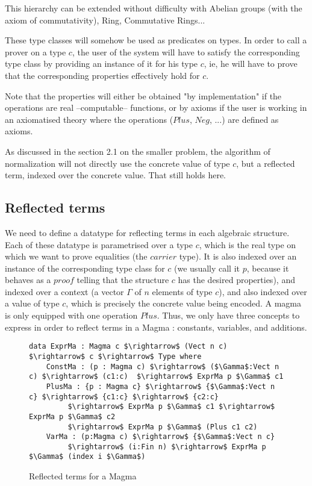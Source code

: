 This hierarchy can be extended without difficulty with Abelian groups (with the axiom of commutativity), Ring, Commutative Rings...

These type classes will somehow be used as predicates on types. In order to call a prover on a type $c$, the user of the system will have to satisfy the corresponding type class by providing an instance of it for his type $c$, ie, he will have to prove that the corresponding properties effectively hold for $c$.

Note that the properties will either be obtained "by implementation" if the operations are real --computable-- functions, or by axioms if the user is working in an axiomatised theory where the operations ($Plus$, $Neg$, ...) are defined as axioms.

As discussed in the section 2.1 on the smaller problem, the algorithm of normalization will not directly use the concrete value of type $c$, but a reflected term, indexed over the concrete value. That still holds here.


	\subsection {Reflected terms}

We need to define a datatype for reflecting terms in each algebraic structure.
Each of these datatype is parametrised over a type $c$, which is the real type on which we want to prove equalities (the $carrier$ type). It is also indexed over an instance of the corresponding type class for $c$ (we usually call it $p$, because it behaves as a $proof$ telling that the structure $c$ has the desired properties), and indexed over a context (a vector $\Gamma$ of $n$ elements of type $c$), and also indexed over a value of type $c$, which is precisely the concrete value being encoded.
A magma is only equipped with one operation $Plus$. Thus, we only have three concepts to express in order to reflect terms in a Magma : constants, variables, and additions.



\begin{figure}[H]
\figrule
\begin{center}
\begin{lstlisting}
data ExprMa : Magma c $\rightarrow$ (Vect n c) $\rightarrow$ c $\rightarrow$ Type where
    ConstMa : (p : Magma c) $\rightarrow$ ($\Gamma$:Vect n c) $\rightarrow$ (c1:c)  $\rightarrow$ ExprMa p $\Gamma$ c1 
    PlusMa : {p : Magma c} $\rightarrow$ {$\Gamma$:Vect n c} $\rightarrow$ {c1:c} $\rightarrow$ {c2:c} 
         $\rightarrow$ ExprMa p $\Gamma$ c1 $\rightarrow$ ExprMa p $\Gamma$ c2 
         $\rightarrow$ ExprMa p $\Gamma$ (Plus c1 c2) 
    VarMa : (p:Magma c) $\rightarrow$ {$\Gamma$:Vect n c}
         $\rightarrow$ (i:Fin n) $\rightarrow$ ExprMa p $\Gamma$ (index i $\Gamma$)
\end{lstlisting}
\end{center}
\caption{Reflected terms for a Magma}
\figrule
\end{figure}

